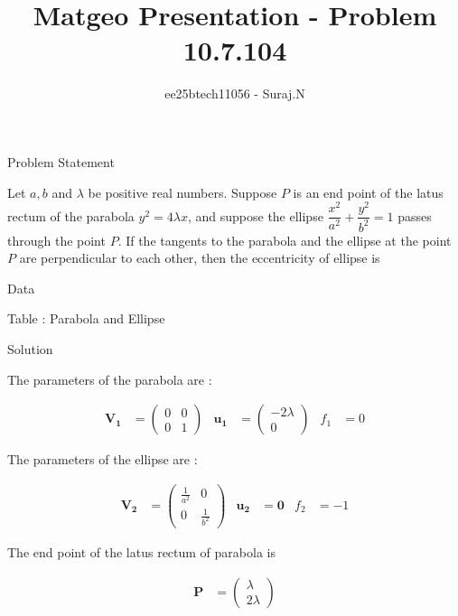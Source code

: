 \documentclass{beamer}
\title{Matgeo Presentation - Problem 10.7.104}
\author{ee25btech11056 - Suraj.N}
\numberwithin{equation}{section}
\theoremstyle{remark}
\newcommand{\myvec}[1]{\ensuremath{\begin{pmatrix}#1\end{pmatrix}}}
\let\vec\mathbf
\begin{document}
\begin{frame}
  \titlepage
\end{frame}

\begin{frame}{Problem Statement}

Let \(a,b\) and \(\lambda\) be positive real numbers. Suppose \(P\) is an end point of the latus rectum of the parabola \(y^2=4\lambda x\), and suppose the ellipse \(\dfrac{x^2}{a^2}+\dfrac{y^2}{b^2}=1\) passes through the point \(P\). If the tangents to the parabola and the ellipse at the point \(P\) are perpendicular to each other, then the eccentricity of ellipse is 

\end{frame}

\begin{frame}{Data}

\begin{table}[h!]
  \centering
  
  \caption*{Table : Parabola and Ellipse}
  \label{10.7.104}
\end{table}

\end{frame}

\begin{frame}{Solution}

The parameters of the parabola are :

\begin{align}
  \vec{V_1} &= \myvec{0 & 0\\0 & 1} & \vec{u_1} &= \myvec{-2\lambda\\0} & f_1 &= 0
\end{align}

The parameters of the ellipse are :

\begin{align}
  \vec{V_2} &= \myvec{\tfrac{1}{a^2} & 0\\0 & \tfrac{1}{b^2}} & \vec{u_2} &= \vec{0} & f_2 &= -1 \label{eq:ellipse} 
\end{align}

The end point of the latus rectum of parabola is 

\begin{align}
  \vec{P} &= \myvec{\lambda\\2\lambda}
\end{align}

\end{frame}
\end{document}
